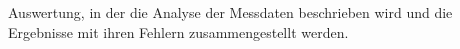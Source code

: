 Auswertung, in der die Analyse der Messdaten beschrieben wird und die Ergebnisse mit ihren Fehlern zusammengestellt werden.